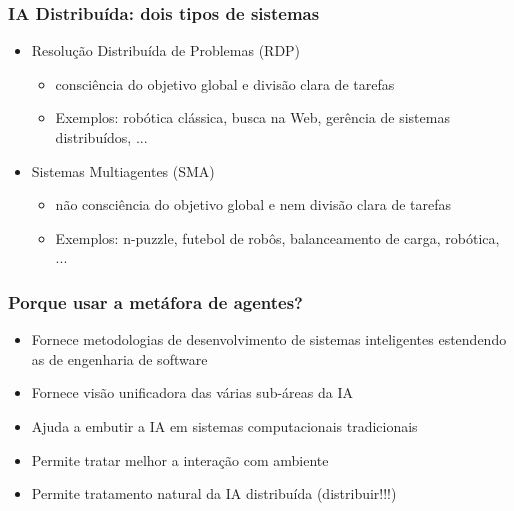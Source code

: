 \begin{frame} %


\frametitle{IA Distribuída: 
dois tipos de sistemas}

\begin{itemize}

  \item Resolução Distribuída de Problemas (RDP)
  \begin{itemize}
    \item consciência do objetivo global e divisão clara de tarefas
     \item Exemplos: robótica clássica, busca na Web, gerência de sistemas distribuídos, ...
  \end{itemize}
 
 \item Sistemas Multiagentes (SMA)
    
     \begin{itemize}
       \item não consciência do objetivo global e nem divisão clara de tarefas
       \item Exemplos: n-puzzle, futebol de robôs, balanceamento de carga, robótica, ...

     \end{itemize}

     \end{itemize}
\end{frame}




\begin{frame} %


\frametitle{Porque usar a metáfora de agentes?}

\begin{itemize}
  \item Fornece metodologias de desenvolvimento de sistemas  inteligentes estendendo as de engenharia de software
   \item Fornece visão unificadora das várias sub-áreas da IA 
  \item  Ajuda a embutir a IA em sistemas computacionais 
tradicionais
  \item  Permite tratar melhor a interação com ambiente 
  \item Permite tratamento natural da IA distribuída (distribuir!!!)
  
\end{itemize}


\end{frame}


